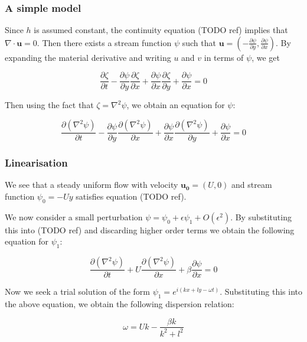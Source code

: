 \documentclass[12pt]{beamer}
\begin{document}
\begin{frame}[fragile]
\frametitle{A simple model}

Since $h$ is assumed constant, the continuity equation (TODO ref) implies that $\nabla \cdot \mathbf{u}=0$. Then there exists a stream function $\psi$ such that $\mathbf{u}=\left(-\frac{\partial \psi}{\partial y},\frac{\partial \psi}{\partial x}\right)$. By expanding the material derivative and writing $u$ and $v$ in terms of $\psi$, we get 

\[
\frac{\partial \zeta}{\partial t}-\frac{\partial \psi}{\partial y}\frac{\partial \zeta}{\partial x}+\frac{\partial \psi}{\partial x}\frac{\partial \zeta}{\partial y}+\frac{\partial \psi}{\partial x}=0
\]

Then using the fact that $\zeta=\nabla^2\psi$, we obtain an equation for $\psi$:

\[
\frac{\partial \left(\nabla^2 \psi\right)}{\partial t}-\frac{\partial \psi}{\partial y}\frac{\partial \left(\nabla^2 \psi\right)}{\partial x}+\frac{\partial \psi}{\partial x}\frac{\partial \left(\nabla^2 \psi\right)}{\partial y}+\frac{\partial \psi}{\partial x}=0
\]
\end{frame}


\begin{frame}[fragile]
\frametitle{Linearisation}
We see that a steady uniform flow with velocity $\mathbf{u_0}=\left(U,0\right)$ and stream function $\psi_0=-Uy$ satisfies equation (TODO ref). 

We now consider a small perturbation $\psi=\psi_0+\epsilon\psi_1+O\left(\epsilon^2\right)$. By substituting this into (TODO ref) and discarding higher order terms we obtain the following equation for $\psi_1$:

\[
\frac{\partial \left(\nabla^2 \psi\right)}{\partial t}+U\frac{\partial \left(\nabla^2 \psi\right)}{\partial x}+\beta\frac{\partial \psi}{\partial x}=0
\]

Now we seek a trial solution of the form $\psi_1=e^{i\left(kx+ly-\omega t\right)}$. Substituting this into the above equation, we obtain the following dispersion relation:

\[
\omega=Uk-\frac{\beta k}{k^2+l^2}
\]

\end{frame}
\end{document}
